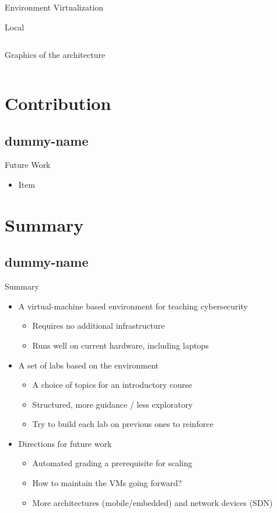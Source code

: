\documentclass{beamer}
\begin{document}
\begin{frame}{Environment Virtualization}
\begin{block}{Local}
{\begin{columns}
            		\begin{column}{0.5\textwidth}
                 		Graphics of the architecture
              		\end{column}
            		\end{columns}		
			}	
		\end{block}		
	\end{frame}	
	
	\section{Contribution}	
	\subsection{dummy-name}
	\begin{frame}{Future Work}
		\begin{itemize}	
			\item Item
		\end{itemize}
	\end{frame}

	\section{Summary}
	\subsection{dummy-name}	
	\begin{frame}{Summary}
		\begin{itemize}
			\item	A virtual-machine based environment for teaching cybersecurity
			\begin{itemize}			
				\item Requires no additional infrastructure
				\item Runs well on current hardware, including laptops
			\end{itemize}	
			\pause			
			\item A set of labs based on the environment
			\begin{itemize}			
				\item A choice of topics for an introductory course
				\item Structured, more guidance / less exploratory
				\item Try to build each lab on previous ones to reinforce
			\end{itemize}	
			\pause
			\item Directions for future work
			\begin{itemize}			
				\item Automated grading a prerequisite for scaling
				\item How to maintain the VMs going forward?
				\item More architectures (mobile/embedded) and network devices (SDN)
			\end{itemize}								
		\end{itemize}
	\end{frame}
	
\end{document}

